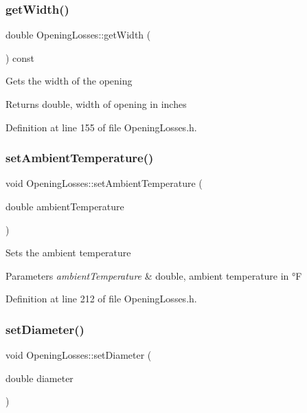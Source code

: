 \subsubsection{\texorpdfstring{get\+Width()}{getWidth()}}
{\footnotesize\ttfamily double Opening\+Losses\+::get\+Width (\begin{DoxyParamCaption}{ }\end{DoxyParamCaption}) const\hspace{0.3cm}{\ttfamily [inline]}}

Gets the width of the opening \begin{DoxyReturn}{Returns}
double, width of opening in inches 
\end{DoxyReturn}


Definition at line 155 of file Opening\+Losses.\+h.

\mbox{\label{class_opening_losses_a3624c9fad2a413871b7324f7e957a5ae}} 
\subsubsection{\texorpdfstring{set\+Ambient\+Temperature()}{setAmbientTemperature()}}
{\footnotesize\ttfamily void Opening\+Losses\+::set\+Ambient\+Temperature (\begin{DoxyParamCaption}\item[{double}]{ambient\+Temperature }\end{DoxyParamCaption})\hspace{0.3cm}{\ttfamily [inline]}}

Sets the ambient temperature 
\begin{DoxyParams}{Parameters}
{\em ambient\+Temperature} & double, ambient temperature in °F \\
\hline
\end{DoxyParams}


Definition at line 212 of file Opening\+Losses.\+h.

\mbox{\label{class_opening_losses_ab840ba51788e83c0b1dc9b8c05b1eadb}} 
\subsubsection{\texorpdfstring{set\+Diameter()}{setDiameter()}}
{\footnotesize\ttfamily void Opening\+Losses\+::set\+Diameter (\begin{DoxyParamCaption}\item[{double}]{diameter }\end{DoxyParamCaption})\hspace{0.3cm}{\ttfamily [inline]}}

